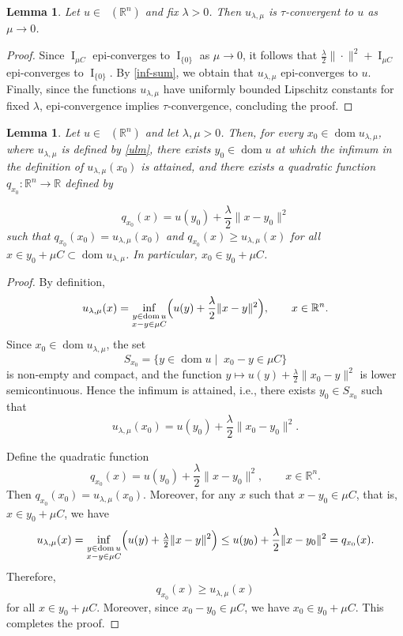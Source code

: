 \documentclass[11pt]{article}
\newtheorem{lema}[teo]{Lemma}
\theoremstyle{definition} %
\DeclareMathOperator{\I}{I}
\DeclareMathOperator{\dom}{dom}
\DeclareMathOperator{\LP}{Conv_{lp}}
\begin{document}
\begin{lema}
Let $u\in \LP(\mathbb{R}^n)$ and fix $\lambda>0$. Then $u_{\lambda,\mu}$ is $\tau$-convergent to $u$ as $\mu \to 0$.
\end{lema}


\begin{proof}
Since $\I_{\mu C}$ epi-converges to $\I_{\{0\}}$ as $\mu \to 0$, it follows that
\(
\frac{\lambda}{2}\|\cdot\|^2 + \I_{\mu C}
\)
epi-converges to $\I_{\{0\}}$.
By \eqref{inf-sum}, we obtain that $u_{\lambda,\mu}$ epi-converges to
\(u\). Finally, since the functions $u_{\lambda,\mu}$ have uniformly bounded Lipschitz constants for fixed $\lambda$, epi-convergence implies $\tau$-convergence, concluding the proof.
\end{proof}


 




\begin{lema}\label{gradient}
Let $u\in \LP(\mathbb{R}^n)$ and let $\lambda,\mu>0$. 
Then, for every $x_0\in\dom u_{\lambda,\mu}$, where $u_{\lambda,\mu}$ is defined by \eqref{ulm}, there exists $y_0 \in \dom u$ at which the infimum in the definition of $u_{\lambda,\mu}(x_0)$ is attained, and there exists a quadratic function 
$q_{x_0}:\mathbb{R}^n\to\mathbb{R}$ defined by

\[
q_{x_0}(x) = u(y_0) + \frac{\lambda}{2}\|x - y_0\|^2
\]
such that $q_{x_0}(x_0)=u_{\lambda,\mu}(x_0)$ and $q_{x_0}(x)\ge u_{\lambda,\mu}(x)$ for all $x\in y_0+\mu C\subset \dom u_{\lambda,\mu}$. In particular, $x_0\in y_0+\mu C$.
\end{lema}






\begin{proof}
By definition,
$$
u_{\lambda,\mu}(x)
=\inf_{\substack{y\in\dom u \\ x-y\in\mu C}}\Bigl(u(y)+\frac{\lambda}{2}\|x-y\|^2\Bigr), \qquad x\in\mathbb{R}^n.
$$
Since $x_0\in\dom u_{\lambda,\mu}$, the  set
$$
S_{x_0}=\{y\in\dom u\mid \;x_0-y\in\mu C\}
$$
is non-empty and compact, and the function 
$y\mapsto u(y)+\frac{\lambda}{2}\|x_0-y\|^2$ 
is lower semicontinuous. Hence the infimum is attained, i.e., there exists $y_0\in S_{x_0}$ such that
$$
u_{\lambda,\mu}(x_0)
= u(y_0)+\frac{\lambda}{2}\|x_0-y_0\|^2.
$$

Define the quadratic function
$$
q_{x_0}(x)=u(y_0)+\frac{\lambda}{2}\|x-y_0\|^2, \qquad x\in\mathbb{R}^n.
$$
Then $q_{x_0}(x_0)=u_{\lambda,\mu}(x_0)$. Moreover, for any $x$ such that $x-y_0\in\mu C$, that is, $x\in y_0+\mu C$,
we have
$$
u_{\lambda,\mu}(x)
=\inf_{\substack{y\in\dom u \\ x-y\in\mu C}}\Bigl(u(y)+\tfrac{\lambda}{2}\|x-y\|^2\Bigr)
\le u(y_0)+\frac{\lambda}{2}\|x-y_0\|^2
=q_{x_0}(x).
$$
Therefore,
$$
q_{x_0}(x)\ge u_{\lambda,\mu}(x)
$$
for all $x\in y_0+\mu C$. Moreover, since $x_0 - y_0 \in \mu C$, we have $x_0 \in y_0 + \mu C$.    This completes the proof. 
\end{proof}
\end{document}

